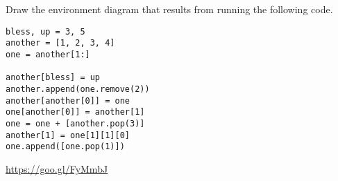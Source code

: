 \begin{blocksection}
\question Draw the environment diagram that results from running the following code.

\begin{lstlisting}
bless, up = 3, 5
another = [1, 2, 3, 4]
one = another[1:]

another[bless] = up
another.append(one.remove(2))
another[another[0]] = one
one[another[0]] = another[1]
one = one + [another.pop(3)]
another[1] = one[1][1][0]
one.append([one.pop(1)])
\end{lstlisting}

\begin{solution}[1in]
\url{https://goo.gl/FyMmbJ}
\end{solution}
\end{blocksection}
